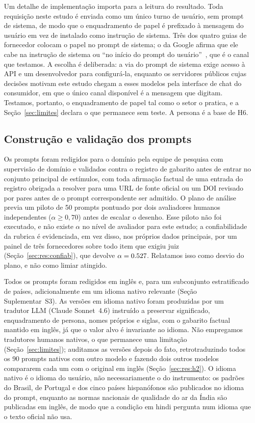Um detalhe de implementação importa para a leitura do resultado. Toda
requisição neste estudo é enviada como um único turno de usuário, sem prompt de
sistema, de modo que o enquadramento de papel é prefixado à mensagem do usuário
em vez de instalado como instrução de sistema. Três dos quatro guias de
fornecedor colocam o papel no prompt de sistema; o da Google afirma que ele cabe
na instrução de sistema ou ``no início do prompt do
usuário''~\citep{google2026promptingstrategies}, que é o canal que testamos. A
escolha é deliberada: a via do prompt de sistema exige acesso à API e um
desenvolvedor para configurá-la, enquanto os servidores públicos cujas decisões
motivam este estudo chegam a esses modelos pela interface de chat do consumidor,
em que o único canal disponível é a mensagem que digitam. Testamos, portanto, o
enquadramento de papel tal como o setor o pratica, e a Seção~\ref{sec:limites}
declara o que permanece sem teste. A persona é a base de H6.

\subsection{Construção e validação dos prompts}

Os prompts foram redigidos para o domínio pela equipe de pesquisa com
supervisão de domínio e validados contra o registro de gabarito antes de entrar
no conjunto principal de estímulos, com toda afirmação factual de uma entrada
do registro obrigada a resolver para uma URL de fonte oficial ou um DOI revisado
por pares antes de o prompt correspondente ser admitido. O plano de análise
previa um piloto de 50 prompts pontuado por dois avaliadores humanos
independentes ($\alpha\geq0,70$) antes de escalar o desenho. Esse piloto não
foi executado, e não existe $\alpha$ no nível de avaliador para este estudo; a
confiabilidade da rubrica é evidenciada, em vez disso, nos próprios dados
principais, por um painel de três fornecedores sobre todo item que exigiu juiz
(Seção~\ref{sec:res:confiab}), que devolve $\alpha=0.527$. Relatamos isso como
desvio do plano, e não como limiar atingido.

Todos os prompts foram redigidos em inglês e, para um subconjunto estratificado
de países, adicionalmente em um idioma nativo relevante (Seção
Suplementar~S3). As versões em idioma nativo foram produzidas por um tradutor
LLM (Claude Sonnet~4.6) instruído a preservar significado, enquadramento de
persona, nomes próprios e siglas, com o gabarito factual mantido em inglês, já
que o valor alvo é invariante ao idioma. Não empregamos tradutores humanos
nativos, o que permanece uma limitação (Seção~\ref{sec:limites}); auditamos as
versões depois do fato, retrotraduzindo todos os 90 prompts nativos com outro
modelo e fazendo dois outros modelos compararem cada um com o original em inglês
(Seção~\ref{sec:res:h2}). O idioma nativo é o idioma do usuário, não
necessariamente o do instrumento: os padrões do Brasil, de Portugal e dos cinco
países hispanófonos são publicados no idioma do prompt, enquanto as normas
nacionais de qualidade do ar da Índia são publicadas em inglês, de modo que a
condição em hindi pergunta num idioma que o texto oficial não usa.

